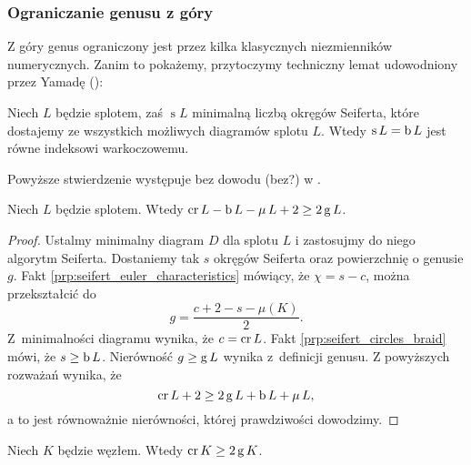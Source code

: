 
\subsubsection{Ograniczanie genusu z góry}
Z góry genus ograniczony jest przez kilka klasycznych niezmienników numerycznych.
Zanim to pokażemy, przytoczymy techniczny lemat udowodniony przez Yamadę (\cite{yamada87}):
%

\begin{proposition}
    \label{prp:seifert_circles_braid}
    Niech $L$ będzie splotem, zaś $\operatorname{s} L$ minimalną liczbą okręgów Seiferta, które dostajemy ze wszystkich możliwych diagramów splotu $L$.
    Wtedy $\operatorname{s} L = \operatorname{b} L$ jest równe indeksowi warkoczowemu.
%
\end{proposition}

Powyższe stwierdzenie występuje bez dowodu (bez?) w \cite[s. 17]{kawauchi96}.

\begin{proposition}
    Niech $L$ będzie splotem.
    Wtedy $\operatorname{cr} L - \operatorname{b} L - \operatorname{\mu} L + 2 \ge 2 \operatorname{g} L$.
\end{proposition}

\begin{proof}
    Ustalmy minimalny diagram $D$ dla splotu $L$ i zastosujmy do niego algorytm Seiferta.
    Dostaniemy tak $s$ okręgów Seiferta oraz powierzchnię o genusie $g$.
    Fakt \ref{prp:seifert_euler_characteristics} mówiący, że $\chi = s - c$, można przekształcić do
    \begin{equation}
        g = \frac{c + 2 - s - \mu(K)}{2}.
    \end{equation}
    Z~minimalności diagramu wynika, że $c = \operatorname{cr} L$.
    Fakt \ref{prp:seifert_circles_braid} mówi, że $s \ge \operatorname{b} L$.
    Nierówność $g \ge \operatorname{g} L$ wynika z~definicji genusu.
    Z powyższych rozważań wynika, że
    \begin{equation}
        \operatorname{cr} L + 2 \ge 2 \operatorname{g} L + \operatorname{b} L + \operatorname{\mu} L,
    \end{equation}
    a to jest równoważnie nierówności, której prawdziwości dowodzimy.
\end{proof}

\begin{corollary}
    \label{cor:crossing_genus}
    Niech $K$ będzie węzłem.
    Wtedy $\operatorname{cr} K \ge 2 \operatorname{g} K$.
\end{corollary}


